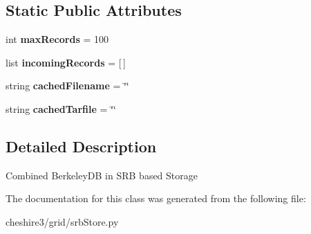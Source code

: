 \subsection*{Static Public Attributes}
\begin{DoxyCompactItemize}
\item 
\hypertarget{classcheshire3_1_1grid_1_1srb_store_1_1_srb_bdb_combine_store_a6c71220bba9757207647660f420e028e}{int {\bfseries max\-Records} = 100}\label{classcheshire3_1_1grid_1_1srb_store_1_1_srb_bdb_combine_store_a6c71220bba9757207647660f420e028e}

\item 
\hypertarget{classcheshire3_1_1grid_1_1srb_store_1_1_srb_bdb_combine_store_aefa8f86005fd7d2dd6ab2622a2020c61}{list {\bfseries incoming\-Records} = \mbox{[}$\,$\mbox{]}}\label{classcheshire3_1_1grid_1_1srb_store_1_1_srb_bdb_combine_store_aefa8f86005fd7d2dd6ab2622a2020c61}

\item 
\hypertarget{classcheshire3_1_1grid_1_1srb_store_1_1_srb_bdb_combine_store_a0ef631cec92b1b7a6702d3971e3c99e1}{string {\bfseries cached\-Filename} = \char`\"{}\char`\"{}}\label{classcheshire3_1_1grid_1_1srb_store_1_1_srb_bdb_combine_store_a0ef631cec92b1b7a6702d3971e3c99e1}

\item 
\hypertarget{classcheshire3_1_1grid_1_1srb_store_1_1_srb_bdb_combine_store_a673f6abab59f2eceb22d3fb0af394d85}{string {\bfseries cached\-Tarfile} = \char`\"{}\char`\"{}}\label{classcheshire3_1_1grid_1_1srb_store_1_1_srb_bdb_combine_store_a673f6abab59f2eceb22d3fb0af394d85}

\end{DoxyCompactItemize}


\subsection{Detailed Description}
\begin{DoxyVerb}Combined BerkeleyDB in SRB based Storage \end{DoxyVerb}
 

The documentation for this class was generated from the following file\-:\begin{DoxyCompactItemize}
\item 
cheshire3/grid/srb\-Store.\-py\end{DoxyCompactItemize}
